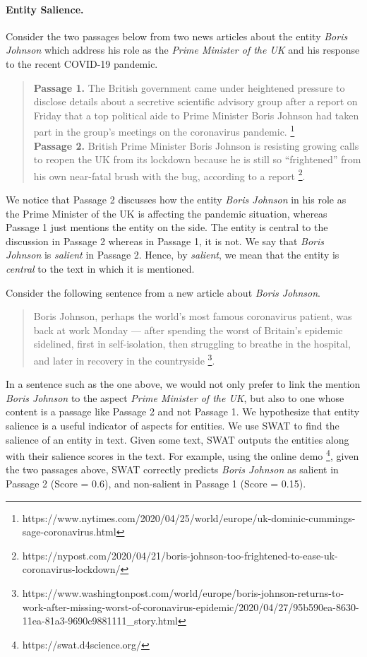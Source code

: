 \paragraph{\textbf{Entity Salience.}} 
Consider the two passages below from two news articles about the entity \textit{Boris Johnson} which address his role as the \textit{Prime Minister of the UK} and his response to the recent COVID-19 pandemic.
\begin{quote}
\textbf{Passage 1.} The British government came under heightened pressure to disclose details about a secretive scientific advisory group after a report on Friday that a top political aide to Prime Minister Boris Johnson had taken part in the group’s meetings on the coronavirus pandemic. \footnote{https://www.nytimes.com/2020/04/25/world/europe/uk-dominic-cummings-sage-coronavirus.html}\\
\textbf{Passage 2.} British Prime Minister Boris Johnson is resisting growing calls to reopen the UK from its lockdown because he is still so “frightened” from his own near-fatal brush with the bug, according to a report \footnote{https://nypost.com/2020/04/21/boris-johnson-too-frightened-to-ease-uk-coronavirus-lockdown/}.
\end{quote}
We notice that Passage 2 discusses how the entity \textit{Boris Johnson} in his role as the Prime Minister of the UK is affecting the pandemic situation, whereas Passage 1 just mentions the entity on the side. The entity is central to the discussion in Passage 2 whereas in Passage 1, it is not. We say that \textit{Boris Johnson} is \textit{salient} in Passage 2. Hence, by \textit{salient}, we mean that the entity is \textit{central} to the text in which it is mentioned. 

Consider the following sentence from a new article about \textit{Boris Johnson}.

\begin{quote}
    Boris Johnson, perhaps the world's most famous coronavirus patient, was back at work Monday — after spending the worst of Britain's epidemic sidelined,
first in self-isolation, then struggling to breathe in the hospital, and later in recovery in the countryside \footnote{https://www.washingtonpost.com/world/europe/boris-johnson-returns-to-work-after-missing-worst-of-coronavirus-epidemic/2020/04/27/95b590ea-8630-11ea-81a3-9690c9881111_story.html}.
\end{quote}

In a sentence such as the one above, we would not only prefer to link the mention \textit{Boris Johnson} to the aspect \textit{Prime Minister of the UK}, but also to one whose content is a passage like Passage 2 and not Passage 1. We hypothesize that entity salience is a useful indicator of aspects for entities. We use SWAT \cite{swat}  to find the salience of an entity in text. Given some text, SWAT outputs the entities along with their salience scores in the text. For example, using the online demo \footnote{https://swat.d4science.org/}, given the two passages above, SWAT correctly predicts \textit{Boris Johnson} as salient in Passage 2 (Score = 0.6), and non-salient in Passage 1 (Score = 0.15). 

